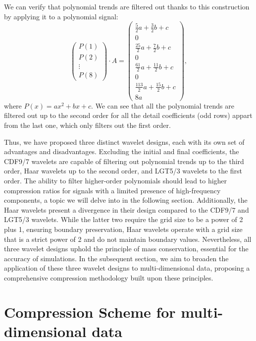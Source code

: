 We can verify that polynomial trends are filtered out thanks to this construction by applying it to a polynomial signal:
\begin{equation}
\begin{pmatrix}
P(1)\\
P(2)\\
\vdots\\
P(8)
\end{pmatrix}
\cdot A =
\begin{pmatrix}
\frac{5}{2}a + \frac{3}{2}b + c\\
0\\
\frac{25}{2}a + \frac{7}{2}b + c\\
0\\
\frac{61}{2}a + \frac{11}{2}b + c\\
0\\
\frac{113}{2}a + \frac{15}{2}b + c\\
8a
\end{pmatrix},
\end{equation}
where \( P(x) = ax^2 + bx + c \).
We can see that all the polynomial trends are filtered out up to the second order for all the detail coefficients (odd rows) appart from the last one, which only filters out the first order.

Thus, we have proposed three distinct wavelet designs, each with its own set of advantages and disadvantages.
Excluding the initial and final coefficients, the CDF9/7 wavelets are capable of filtering out polynomial trends up to the third order, Haar wavelets up to the second order, and LGT5/3 wavelets to the first order.
The ability to filter higher-order polynomials should lead to higher compression ratios for signals with a limited presence of high-frequency components, a topic we will delve into in the following section.
Additionally, the Haar wavelets present a divergence in their design compared to the CDF9/7 and LGT5/3 wavelets.
While the latter two require the grid size to be a power of 2 plus 1, ensuring boundary preservation, Haar wavelets operate with a grid size that is a strict power of 2 and do not maintain boundary values.
Nevertheless, all three wavelet designs uphold the principle of mass conservation, essential for the accuracy of simulations.
In the subsequent section, we aim to broaden the application of these three wavelet designs to multi-dimensional data, proposing a comprehensive compression methodology built upon these principles.

\section{Compression Scheme for multi-dimensional data}

